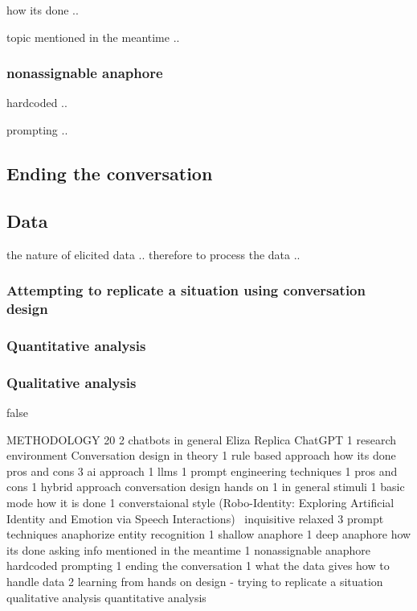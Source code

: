 \documentclass[12pt]{report}
\begin{document}
{\par
how its done ..

\par
topic mentioned in the meantime ..

\subsubsection{nonassignable anaphore}

\par
hardcoded ..

\par
prompting ..

\subsection{Ending the conversation}

\subsection{Data}

\par
the nature of elicited data ..
therefore to process the data ..

\subsubsection{Attempting to replicate a situation using conversation design}

\subsubsection{Quantitative analysis}

\subsubsection{Qualitative analysis}





\if false

METHODOLOGY 20
    2 chatbots in general
        Eliza
        Replica
        ChatGPT
	1 research environment
	Conversation design in theory
	1 rule based approach
		how its done
		pros and cons
	3 ai approach
		1 llms
		1 prompt engineering techniques
		1 pros and cons
	1 hybrid approach
	conversation design hands on
	1	in general
		stimuli
	1		basic mode
				how it is done
	1			converstaional style
	                (Robo-Identity: Exploring Artificial Identity and Emotion via Speech Interactions) \
					inquisitive
					relaxed
	3		prompt techniques
				anaphorize
				entity recognition
	1		shallow anaphore
	1		deep anaphore
				how its done
				asking info mentioned in the meantime
	1		nonassignable anaphore
				hardcoded
				prompting
	1	ending the conversation
	1 what the data gives
	   how to handle data
	2 learning from
	    hands on design - trying to replicate a situation
		qualitative analysis
		quantitative analysis

}
\end{document}
